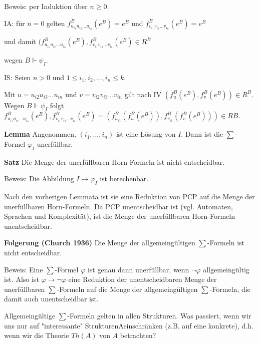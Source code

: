 \documentclass[a4paper]{article}
\renewcommand{\note}[2]{\begin{noteBox} \textbf{#1} #2 \end{noteBox}}
\begin{document}
\begin{multicols}{3}
  Beweis: per Induktion über $n\geq 0$.
  \begin{itemize*}
    \item IA: für $n=0$ gelten $f_{u_{i_1} u_{i_2} ...u_{i_n}}^B(e^B) =e^B$ und $f_{v_{i_1} v_{i_2}...v_{i_n}}^B(e^B) =e^B$
    \begin{itemize*}
      \item und damit $(f_{u_{i_1} u_{i_2} ...u_{i_n}}^B(e^B), f_{v_{i_1} v_{i_2}...v_{i_n}}^B(e^B) \in R^B$
      \item wegen $B\Vdash\psi_I$.
    \end{itemize*}
    \item IS: Seien $n>0$ und $1\leq i_1 ,i_2 ,...,i_n\leq k$.
    \begin{itemize*}
      \item Mit $u=u_{i2} u_{i3} ...u_{in}$ und $v=v_{i2} v_{i3} ...v_{in}$ gilt nach IV $(f_u^B(e^B),f_v^B(e^B))\in R^B$. Wegen $B\Vdash\psi_I$ folgt $f_{u_{i_1} u_{i_2} ...u_{i_n}}^B(e^B), f_{v_{i_1} v_{i_2}...v_{i_n}}^B(e^B) = (f_{u_{i1}}^B (f_u^B(e^B)),f_{v_{i1}}^B (f_v^B(e^B)))\in RB$.
    \end{itemize*}
  \end{itemize*}

  \note{Lemma}{Angenommen, $(i_1,...,i_n)$ ist eine Lösung von $I$. Dann ist die $\sum$-Formel $\varphi_I$ unerfüllbar.}

  \note{Satz}{Die Menge der unerfüllbaren Horn-Formeln ist nicht entscheidbar.}

  Beweis: Die Abbildung $I\rightarrow\varphi_I$ ist berechenbar.

  Nach den vorherigen Lemmata ist sie eine Reduktion von PCP auf die Menge der unerfüllbaren Horn-Formeln. Da PCP unentscheidbar ist (vgl. Automaten, Sprachen und Komplexität), ist die Menge der unerfüllbaren Horn-Formeln unentscheidbar.

  \note{Folgerung (Church 1936)}{Die Menge der allgemeingültigen $\sum$-Formeln ist nicht entscheidbar.}

  Beweis: Eine $\sum$-Formel $\varphi$ ist genau dann unerfüllbar, wenn $\lnot\varphi$ allgemeingültig ist. Also ist $\varphi\rightarrow\lnot\varphi$ eine Reduktion der unentscheidbaren Menge der unerfüllbaren $\sum$-Formeln auf die Menge der allgemeingültigen $\sum$-Formeln, die damit auch unentscheidbar ist.

  Allgemeingültige $\sum$-Formeln gelten in allen Strukturen. Was passiert, wenn wir uns nur auf "interessante" StrukturenAeinschränken (z.B. auf eine konkrete), d.h. wenn wir die Theorie $Th(A)$ von $A$ betrachten?



\end{multicols}
\end{document}
